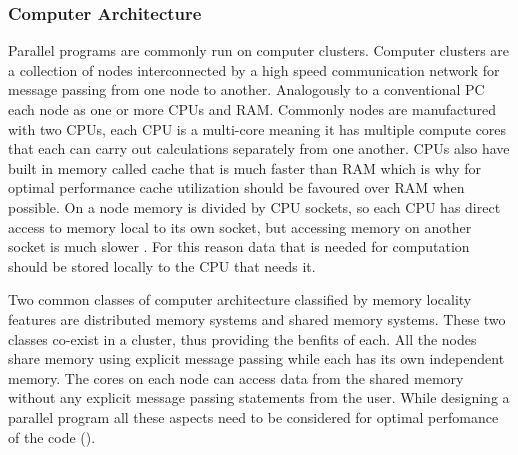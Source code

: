 \documentclass[preprint,11pt,authoryear]{elsarticle}
\begin{document}
		\subsubsection{Computer Architecture}
	    \par Parallel programs are commonly run on computer clusters. Computer clusters are a collection of nodes interconnected by a high speed communication network for message passing from one node to another. Analogously to a conventional PC each node as one or more CPUs and RAM. Commonly nodes are manufactured with two CPUs, each CPU is a multi-core meaning it has multiple compute cores that each can carry out calculations separately from one another. CPUs also have built in memory called cache that is much faster than RAM which is why for optimal performance cache utilization should be favoured over RAM when possible. On a node memory is divided by CPU sockets, so each CPU has direct access to memory local to its own socket, but accessing memory on another socket is much slower \cite{Jin2011}. For this reason data that is needed for computation should be stored locally to the CPU that needs it.  
	    \par Two common classes of computer architecture classified by memory locality features are distributed memory systems and shared memory systems. These two classes co-exist in a cluster, thus providing the benfits of each. All the nodes share memory using explicit message passing while each has its own independent memory. The cores on each node can access data from the shared memory without any explicit message passing statements from the user. While designing a parallel program all these aspects need to be considered for optimal perfomance of the code (\cite{Adhianto2007}).
		
\end{document}
